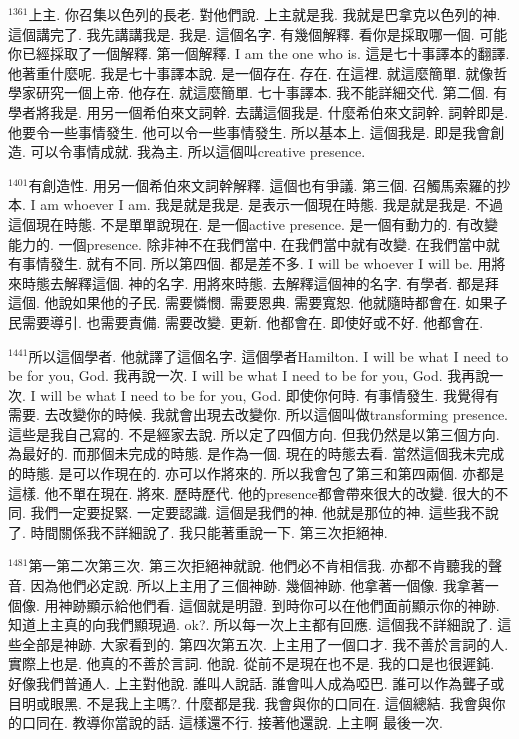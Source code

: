 \documentclass{book}
\begin{document}
$^{1361}$上主.
你召集以色列的長老.
對他們說.
上主就是我.
我就是巴拿克以色列的神.
這個講完了.
我先講講我是.
我是.
這個名字.
有幾個解釋.
看你是採取哪一個.
可能你已經採取了一個解釋.
第一個解釋.
I am the one who is.
這是七十事譯本的翻譯.
他著重什麼呢.
我是七十事譯本說.
是一個存在.
存在.
在這裡.
就這麼簡單.
就像哲學家研究一個上帝.
他存在.
就這麼簡單.
七十事譯本.
我不能詳細交代.
第二個.
有學者將我是.
用另一個希伯來文詞幹.
去講這個我是.
什麼希伯來文詞幹.
詞幹即是.
他要令一些事情發生.
他可以令一些事情發生.
所以基本上.
這個我是.
即是我會創造.
可以令事情成就.
我為主.
所以這個叫creative presence.

$^{1401}$有創造性.
用另一個希伯來文詞幹解釋.
這個也有爭議.
第三個.
召觸馬索羅的抄本.
I am whoever I am.
我是就是我是.
是表示一個現在時態.
我是就是我是.
不過這個現在時態.
不是單單說現在.
是一個active presence.
是一個有動力的.
有改變能力的.
一個presence.
除非神不在我們當中.
在我們當中就有改變.
在我們當中就有事情發生.
就有不同.
所以第四個.
都是差不多.
I will be whoever I will be.
用將來時態去解釋這個.
神的名字.
用將來時態.
去解釋這個神的名字.
有學者.
都是拜這個.
他說如果他的子民.
需要憐憫.
需要恩典.
需要寬恕.
他就隨時都會在.
如果子民需要導引.
也需要責備.
需要改變.
更新.
他都會在.
即使好或不好.
他都會在.

$^{1441}$所以這個學者.
他就譯了這個名字.
這個學者Hamilton.
I will be what I need to be for you, God.
我再說一次.
I will be what I need to be for you, God.
我再說一次.
I will be what I need to be for you, God.
即使你何時.
有事情發生.
我覺得有需要.
去改變你的時候.
我就會出現去改變你.
所以這個叫做transforming presence.
這些是我自己寫的.
不是經家去說.
所以定了四個方向.
但我仍然是以第三個方向.
為最好的.
而那個未完成的時態.
是作為一個.
現在的時態去看.
當然這個我未完成的時態.
是可以作現在的.
亦可以作將來的.
所以我會包了第三和第四兩個.
亦都是這樣.
他不單在現在.
將來.
歷時歷代.
他的presence都會帶來很大的改變.
很大的不同.
我們一定要捉緊.
一定要認識.
這個是我們的神.
他就是那位的神.
這些我不說了.
時間關係我不詳細說了.
我只能著重說一下.
第三次拒絕神.

$^{1481}$第一第二次第三次.
第三次拒絕神就說.
他們必不肯相信我.
亦都不肯聽我的聲音.
因為他們必定說.
所以上主用了三個神跡.
幾個神跡.
他拿著一個像.
我拿著一個像.
用神跡顯示給他們看.
這個就是明證.
到時你可以在他們面前顯示你的神跡.
知道上主真的向我們顯現過.
ok?.
所以每一次上主都有回應.
這個我不詳細說了.
這些全部是神跡.
大家看到的.
第四次第五次.
上主用了一個口才.
我不善於言詞的人.
實際上也是.
他真的不善於言詞.
他說.
從前不是現在也不是.
我的口是也很遲鈍.
好像我們普通人.
上主對他說.
誰叫人說話.
誰會叫人成為啞巴.
誰可以作為聾子或目明或眼黑.
不是我上主嗎?.
什麼都是我.
我會與你的口同在.
這個總結.
我會與你的口同在.
教導你當說的話.
這樣還不行.
接著他還說.
上主啊 最後一次.
\end{document}
